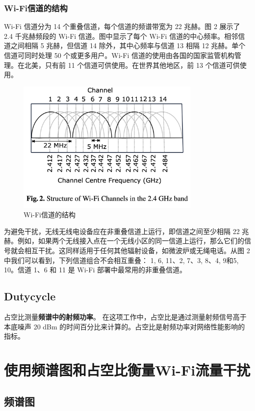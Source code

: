 \subsubsection{Wi-Fi信道的结构}

Wi-Fi 信道分为 14 个重叠信道，每个信道的频谱带宽为 22 兆赫。图 2 展示了 2.4 千兆赫频段的 Wi-Fi 信道。图中显示了每个 Wi-Fi 信道的中心频率。相邻信道之间相隔 5 兆赫，但信道 14 除外，其中心频率与信道 13 相隔 12 兆赫。单个信道可同时处理 50 个或更多用户。Wi-Fi 信道的使用由各国的国家监管机构管理。在北美，只有前 11 个信道可供使用。在世界其他地区，前 13 个信道可供使用。

\begin{figure}[h]
    \centering
    \includegraphics[width=9cm]{res/wifi3.png}
    \caption{Wi-Fi信道的结构}
\end{figure}

为避免干扰，无线无线电设备应在非重叠信道上运行，即信道之间至少相隔 22 兆赫。例如，如果两个无线接入点在一个无线小区的同一信道上运行，那么它们的信号就会相互干扰。这同样适用于任何其他辐射设备，如微波炉或无绳电话。从图 2 中我们可以看到，下列信道组合不会相互重叠： {1, 6, 11}、{2, 7}、{3, 8}、{4, 9}和{5, 10}。信道 1、6 和 11 是 Wi-Fi 部署中最常用的非重叠信道。

\subsection{Dutycycle}
占空比测量\textbf{频谱中的射频功率}。
在这项工作中，占空比是通过测量射频信号高于本底噪声 20 dBm 的时间百分比来计算的。占空比是射频功率对网络性能影响的指标。
\section{使用频谱图和占空比衡量Wi-Fi流量干扰}

\subsection{频谱图}

